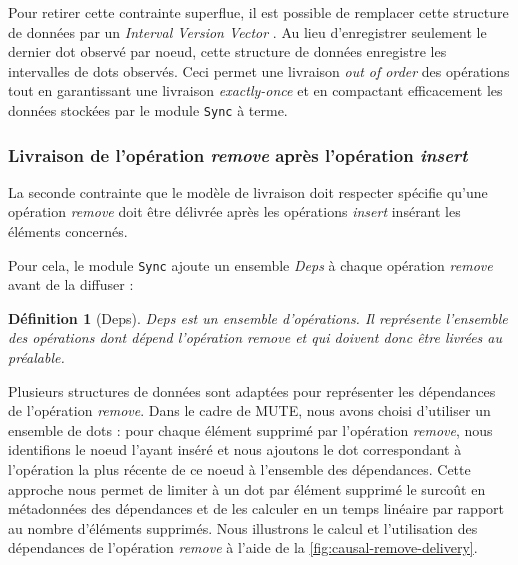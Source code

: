 \documentclass[12pt]{thesul}
\newtheorem{definition}{Définition}
\begin{document}
Pour retirer cette contrainte superflue, il est possible de remplacer cette structure de données par un \emph{Interval Version Vector} \cite{2014-optimized-or-sets}.
Au lieu d'enregistrer seulement le dernier dot observé par noeud, cette structure de données enregistre les intervalles de dots observés.
Ceci permet une livraison \emph{out of order} des opérations tout en garantissant une livraison \emph{exactly-once} et en compactant efficacement les données stockées par le module \texttt{Sync} à terme.

\subsubsection{Livraison de l'opération \emph{remove} après l'opération \emph{insert}}

La seconde contrainte que le modèle de livraison doit respecter spécifie qu'une opération \emph{remove} doit être délivrée après les opérations \emph{insert} insérant les éléments concernés.

Pour cela, le module \texttt{Sync} ajoute un ensemble \emph{Deps} à chaque opération \emph{remove} avant de la diffuser :

\begin{definition}[Deps]
  \emph{Deps} est un ensemble d'opérations.
  Il représente l'ensemble des opérations dont dépend l'opération \emph{remove} et qui doivent donc être livrées au préalable.
\end{definition}

Plusieurs structures de données sont adaptées pour représenter les dépendances de l'opération \emph{remove}.
Dans le cadre de MUTE, nous avons choisi d'utiliser un ensemble de dots : pour chaque élément supprimé par l'opération \emph{remove}, nous identifions le noeud l'ayant inséré et nous ajoutons le dot correspondant à l'opération la plus récente de ce noeud à l'ensemble des dépendances.
Cette approche nous permet de limiter à un dot par élément supprimé le surcoût en métadonnées des dépendances et de les calculer en un temps linéaire par rapport au nombre d'éléments supprimés.
Nous illustrons le calcul et l'utilisation des dépendances de l'opération \emph{remove} à l'aide de la \autoref{fig:causal-remove-delivery}.
\end{document}
